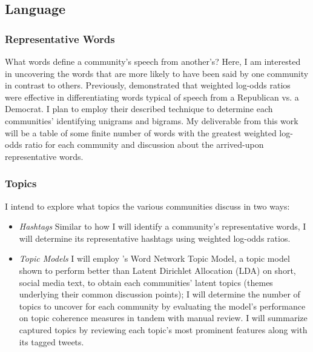 \documentclass[acmlarge, screen, authorversion]{acmart}
\begin{document}
\subsection{Language}

\subsubsection{Representative Words}

What words define a community's speech from another's? Here, I am interested in
uncovering the words that are more likely to have been said by one community in
contrast to others. Previously, \citet{monroeFightinWordsLexical2008}
demonstrated that weighted log-odds ratios were effective in differentiating
words typical of speech from a Republican vs. a Democrat. I plan to employ their
described technique to determine each communities' identifying unigrams and
bigrams. My deliverable from this work will be a table of some finite number of
words with the greatest weighted log-odds ratio for each community and
discussion about the arrived-upon representative words.
\subsubsection{Topics}

I intend to explore what topics the various communities discuss in two ways:

\begin{itemize}
	\item \textit{Hashtags} Similar to how I will identify a community's representative words, I will determine its representative hashtags using weighted log-odds ratios.

	\item \textit{Topic Models} I will employ \citet{zuoWordNetworkTopic2016}'s Word
	Network Topic Model, a topic model shown to perform better than Latent
	Dirichlet Allocation (LDA) \cite{maierApplyingLDATopic2018} on short, social media text, to obtain
	each communities' latent topics (themes underlying their common discussion
	points); I will determine the number of topics to uncover for each community by
	evaluating the model's performance on topic coherence measures \cite{fangTopicsTweetsUser2016} in
	tandem with manual review. I will summarize captured topics by reviewing each
	topic's most prominent features along with its tagged tweets.

\end{itemize}
\end{document}

